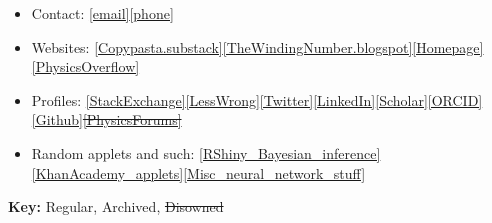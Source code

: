 \documentclass{article}
\newcommand{\disown}[1]{\sout{#1}}
\newcommand{\archive}{\color{lightgray}}
\begin{document}
\begin{itemize}
    \item Contact:  \href{mailto:abhimanyupallavisudhir@gmail.com}{[email]}\href{tel:+44-7771824896}{[phone]} %
    \item Websites: \href{https://copypasta.substack.com}{[Copypasta.substack]}\href{https://thewindingnumber.blogspot.com/}{[TheWindingNumber.blogspot]}\href{https://abhimanyu.io/}{[Homepage]}{\archive\href{https://physicsoverflow.org/}{[PhysicsOverflow]}}
    \item Profiles: \href{https://math.stackexchange.com/users/78451/abhimanyu-pallavi-sudhir}{[StackExchange]}\href{https://www.lesswrong.com/users/abhimanyu-pallavi-sudhir}{[LessWrong]}\href{https://twitter.com/abhimanyupasu}{[Twitter]}\href{https://www.linkedin.com/in/abhimanyu-pallavi-sudhir/}{[LinkedIn]}\href{https://scholar.google.com/citations?user=lb38BjYAAAAJ&hl=en}{[Scholar]}\href{https://orcid.org/0000-0002-2506-0515}{[ORCID]}{\archive\href{https://github.com/abhimanyupallavisudhir/}{[Github]}\disown{\href{https://www.physicsforums.com/members/dimension10}{[PhysicsForums]}}}
    \item {\archive Random applets and such: \href{https://abhimanyups.shinyapps.io/BayesianInference/}{[RShiny\_Bayesian\_inference]}\href{https://www.khanacademy.org/profile/abhimanyupallavisudhir/projects}{[KhanAcademy\_applets]}\href{https://thewindingnumber.blogspot.com/p/blog.html}{[Misc\_neural\_network\_stuff]}}
\end{itemize}

\vspace{1em}

\textbf{Key:} Regular, {\archive Archived}, {\archive \disown{Disowned}}





\end{document}
